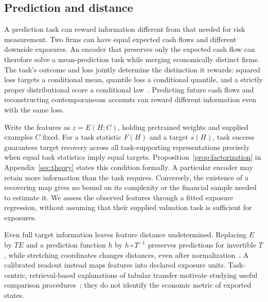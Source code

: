 \documentclass[11pt]{article}
\begin{document}
\subsection{Prediction and distance}
A prediction task can reward information different from that needed for risk
measurement. Two firms can have equal expected cash flows and different downside
exposures. An encoder that preserves only the expected cash flow can therefore
solve a mean-prediction task while merging economically distinct firms.
The task's outcome and loss jointly determine the distinction it rewards:
squared loss targets a conditional mean, quantile loss a conditional quantile,
and a strictly proper distributional score a conditional law~\cite{gneiting}.
Predicting future cash flows and reconstructing contemporaneous accounts can
reward different information even with the same loss.

Write the features as $z=E(H;C)$, holding pretrained weights and supplied
examples $C$ fixed. For a task statistic $F(H)$ and a target $s(H)$,
task success
guarantees target recovery across all task-supporting representations precisely
when equal task statistics imply equal targets.
Proposition~\ref{prop:factorization} in Appendix~\ref{sec:theory} states this
condition formally. A particular encoder may retain more information than the
task requires. Conversely, the existence of a recovering map gives no bound on
its complexity or the financial sample needed to estimate it. We assess the
observed features through a fitted exposure regression, without assuming that
their supplied valuation task is sufficient for exposures.

Even full target information leaves feature distance undetermined. Replacing
$E$ by $T E$ and a prediction function $h$ by $h\circ T^{-1}$ preserves
predictions for invertible $T$, while stretching coordinates changes distances,
even after normalization~\cite{steck}. A calibrated readout instead
maps features
into declared exposure units. Task-centric, retrieval-based explanations of
tabular transfer motivate studying useful comparison procedures~\cite{shaheen};
they do not identify the economic metric of exported states.
\end{document}

